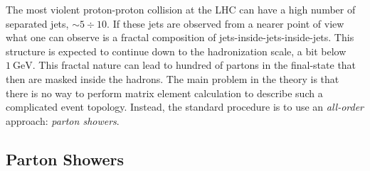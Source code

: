 %
%

The most violent proton-proton collision at the LHC can have a high number of separated jets, $\sim 5\div 10$. If these jets are observed from a nearer point of view what one can observe is a fractal composition of jets-inside-jets-inside-jets. This structure is expected to continue down to the hadronization scale, a bit below $1\ \mathrm{GeV}$. This fractal nature can lead to hundred of partons in the final-state that then are masked inside the hadrons.
The main problem in the theory is that there is no way to perform matrix element calculation to describe such a complicated event topology. Instead, the standard procedure is to use an \textit{all-order} approach: \textit{parton showers}.  




\subsection{Parton Showers}
 
 
